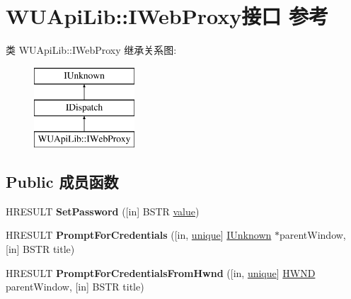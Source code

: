 \hypertarget{interface_w_u_api_lib_1_1_i_web_proxy}{}\section{W\+U\+Api\+Lib\+:\+:I\+Web\+Proxy接口 参考}
\label{interface_w_u_api_lib_1_1_i_web_proxy}
类 W\+U\+Api\+Lib\+:\+:I\+Web\+Proxy 继承关系图\+:\begin{figure}[H]
\begin{center}
\leavevmode
\includegraphics[height=3.000000cm]{interface_w_u_api_lib_1_1_i_web_proxy}
\end{center}
\end{figure}
\subsection*{Public 成员函数}
\begin{DoxyCompactItemize}
\item 
\mbox{\label{interface_w_u_api_lib_1_1_i_web_proxy_ad1b190a25166986e3b7cf5abd83605d4}} 
H\+R\+E\+S\+U\+LT {\bfseries Set\+Password} (\mbox{[}in\mbox{]} B\+S\+TR \hyperlink{unionvalue}{value})
\item 
\mbox{\label{interface_w_u_api_lib_1_1_i_web_proxy_a98ba64d365fe8a7b9be076e14ffb261a}} 
H\+R\+E\+S\+U\+LT {\bfseries Prompt\+For\+Credentials} (\mbox{[}in, \hyperlink{interfaceunique}{unique}\mbox{]} \hyperlink{interface_i_unknown}{I\+Unknown} $\ast$parent\+Window, \mbox{[}in\mbox{]} B\+S\+TR title)
\item 
\mbox{\label{interface_w_u_api_lib_1_1_i_web_proxy_ab326f9f0f94afdc72bd0e3ac8645e836}} 
H\+R\+E\+S\+U\+LT {\bfseries Prompt\+For\+Credentials\+From\+Hwnd} (\mbox{[}in, \hyperlink{interfaceunique}{unique}\mbox{]} \hyperlink{interfacevoid}{H\+W\+ND} parent\+Window, \mbox{[}in\mbox{]} B\+S\+TR title)
\end{DoxyCompactItemize}
